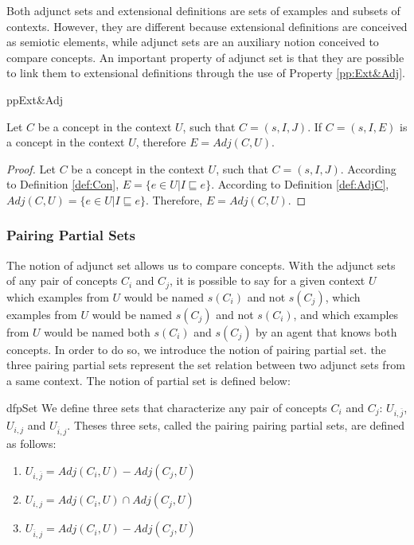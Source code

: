 Both adjunct sets and extensional definitions are sets of examples and subsets of contexts. However, they are different because  extensional definitions are conceived as semiotic elements, while adjunct sets are an auxiliary notion conceived to compare concepts. An important property of adjunct set is that they are possible to link them to extensional definitions through the use of Property \ref{pp:Ext&Adj}.

\begin{restatable}{pp}{Ext&Adj}
\label{pp:Ext&Adj}

Let $C$ be a concept in the context $U$, such that $C = (s,I,J)$. If $C = (s,I,E)$ is a concept in the context $U$, therefore $E = Adj(C,U)$.

\end{restatable}

\begin{proof}
Let $C$ be a concept in the context $U$, such that $C = (s,I,J)$.
According to Definition \ref{def:Con}, $E = \{ e \in U | I \sqsubseteq e \}$.
According to Definition \ref{def:AdjC}, $Adj(C,U) = \{ e \in U | I \sqsubseteq e \}$.
Therefore, $E = Adj(C,U)$.
\end{proof}

\subsubsection{Pairing Partial Sets}\label{sec:PPSet}

The notion of adjunct set allows us to compare concepts. With the adjunct sets of any pair of concepts $C_{i}$ and $C_{j}$, it is possible to say for a given context $U$ which examples from $U$ would be named $s(C_{i})$ and not $s(C_{j})$, which examples from $U$ would be named $s(C_{j})$ and not $s(C_{i})$, and which examples from $U$ would be named both $s(C_{i})$ and $s(C_{j})$ by an agent that knows both concepts. In order to do so, we introduce the notion of pairing partial set. the three pairing partial sets represent the set relation between two adjunct sets from a same context. The notion of partial set is defined below:


\begin{restatable}{df}{pSet}
\label{def:PSet}
We define three  sets that characterize any pair of concepts $C_{i}$ and $C_{j}$: $U_{i,\overbar{j}}$, $U_{i,j}$ and $U_{\overbar{i},j}$. Theses three sets, called the pairing pairing partial sets, are defined as follows:
\begin{enumerate}
\item $U_{i,\overbar{j}} = Adj(C_{i}, U) - Adj(C_{j}, U)$
\item $U_{i,j} = Adj(C_{i}, U) \cap Adj(C_{j}, U)$
\item $U_{\overbar{i},j} = Adj(C_{i}, U) - Adj(C_{j}, U)$
\end{enumerate}
\end{restatable}

